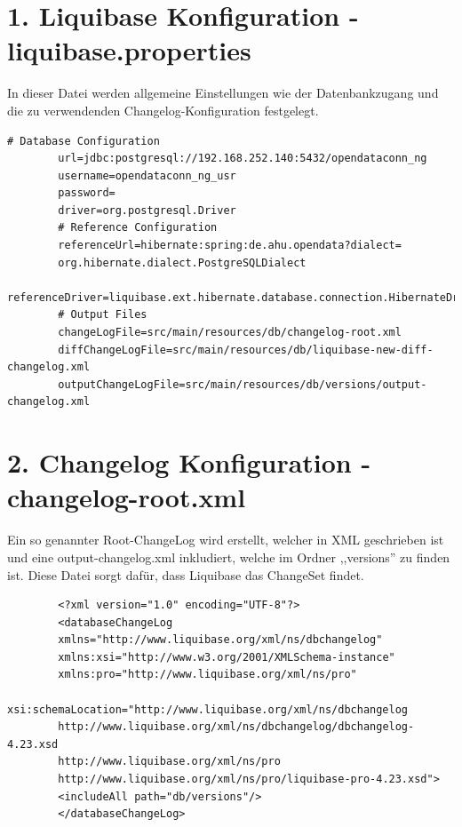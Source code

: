 \documentclass[a4paper,12pt]{scrreprt}
\begin{document}
	\section*{\small \textbf{1. Liquibase Konfiguration - liquibase.properties}}
	In dieser Datei werden allgemeine Einstellungen wie der Datenbankzugang und die zu verwendenden Changelog-Konfiguration festgelegt.
	\begin{lstlisting}[language=properties]
		# Database Configuration
		url=jdbc:postgresql://192.168.252.140:5432/opendataconn_ng
		username=opendataconn_ng_usr
		password=
		driver=org.postgresql.Driver
		# Reference Configuration
		referenceUrl=hibernate:spring:de.ahu.opendata?dialect=
		org.hibernate.dialect.PostgreSQLDialect
		referenceDriver=liquibase.ext.hibernate.database.connection.HibernateDriver
		# Output Files
		changeLogFile=src/main/resources/db/changelog-root.xml
		diffChangeLogFile=src/main/resources/db/liquibase-new-diff-changelog.xml
		outputChangeLogFile=src/main/resources/db/versions/output-changelog.xml
	\end{lstlisting}
	\section*{\small \textbf{2. Changelog Konfiguration - changelog-root.xml}}
	Ein so genannter Root-ChangeLog wird erstellt, welcher in XML geschrieben ist und eine output-changelog.xml inkludiert, welche im Ordner ,,versions'' zu finden ist. Diese Datei sorgt dafür, dass Liquibase das ChangeSet findet.
	\begin{lstlisting}
		<?xml version="1.0" encoding="UTF-8"?>   
		<databaseChangeLog
		xmlns="http://www.liquibase.org/xml/ns/dbchangelog"
		xmlns:xsi="http://www.w3.org/2001/XMLSchema-instance"
		xmlns:pro="http://www.liquibase.org/xml/ns/pro"
		xsi:schemaLocation="http://www.liquibase.org/xml/ns/dbchangelog
		http://www.liquibase.org/xml/ns/dbchangelog/dbchangelog-4.23.xsd
		http://www.liquibase.org/xml/ns/pro 
		http://www.liquibase.org/xml/ns/pro/liquibase-pro-4.23.xsd">  
		<includeAll path="db/versions"/>  
		</databaseChangeLog>
	\end{lstlisting}
\end{document}

